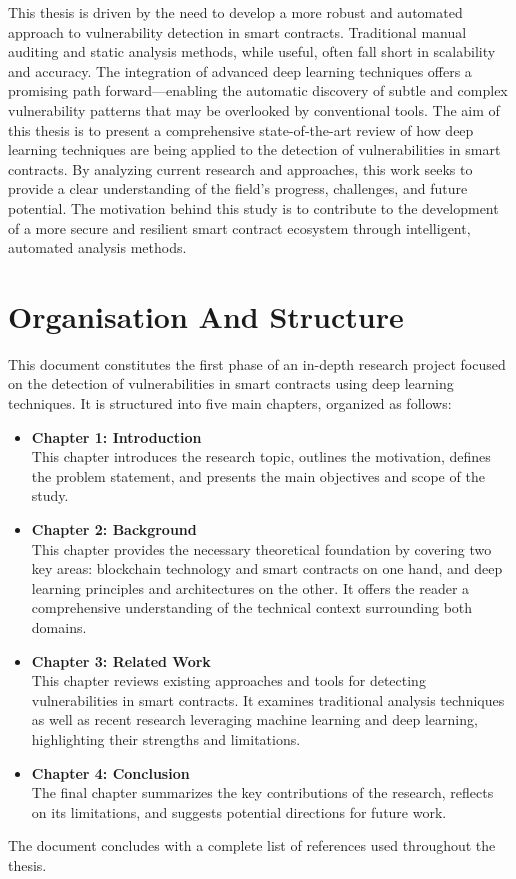 This thesis is driven by the need to develop a more robust and automated approach to vulnerability detection in smart contracts. Traditional manual auditing and static analysis methods, while useful, often fall short in scalability and accuracy. The integration of advanced deep learning techniques offers a promising path forward—enabling the automatic discovery of subtle and complex vulnerability patterns that may be overlooked by conventional tools. The aim of this thesis is to present a comprehensive state-of-the-art review of how deep learning techniques are being applied to the detection of vulnerabilities in smart contracts. By analyzing current research and approaches, this work seeks to provide a clear understanding of the field’s progress, challenges, and future potential. The motivation behind this study is to contribute to the development of a more secure and resilient smart contract ecosystem through intelligent, automated analysis methods.

\chapter{Organisation And Structure}
This document constitutes the first phase of an in-depth research project focused on the detection of vulnerabilities in smart contracts using deep learning techniques. It is structured into five main chapters, organized as follows:

\begin{itemize}
    \item \textbf{Chapter 1: Introduction} \\
    This chapter introduces the research topic, outlines the motivation, defines the problem statement, and presents the main objectives and scope of the study.

    \item \textbf{Chapter 2: Background} \\
    This chapter provides the necessary theoretical foundation by covering two key areas: blockchain technology and smart contracts on one hand, and deep learning principles and architectures on the other. It offers the reader a comprehensive understanding of the technical context surrounding both domains.

    \item \textbf{Chapter 3: Related Work} \\
    This chapter reviews existing approaches and tools for detecting vulnerabilities in smart contracts. It examines traditional analysis techniques as well as recent research leveraging machine learning and deep learning, highlighting their strengths and limitations.


    \item \textbf{Chapter 4: Conclusion} \\
    The final chapter summarizes the key contributions of the research, reflects on its limitations, and suggests potential directions for future work.
\end{itemize}

The document concludes with a complete list of references used throughout the thesis.